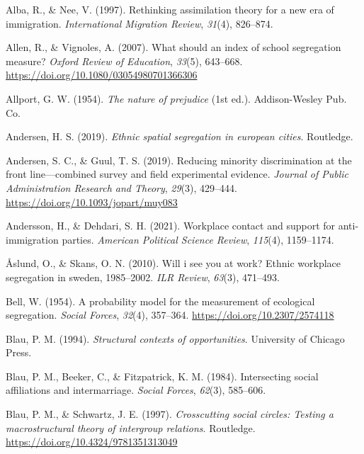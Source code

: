 \documentclass[
]{book}
\newlength{\cslhangindent}
\newenvironment{CSLReferences}[2] %
 {\begin{list}{}{%
  \setlength{\itemindent}{0pt}
  \setlength{\leftmargin}{0pt}
  \setlength{\parsep}{0pt}
  \ifodd #1
   \setlength{\leftmargin}{\cslhangindent}
   \setlength{\itemindent}{-1\cslhangindent}
  \fi
  \setlength{\itemsep}{#2\baselineskip}}}
 {\end{list}}
\begin{document}
\label{refs}
\begin{CSLReferences}{1}{0}
Alba, R., \& Nee, V. (1997). Rethinking assimilation theory for a new era of immigration. \emph{International Migration Review}, \emph{31}(4), 826--874.

Allen, R., \& Vignoles, A. (2007). What should an index of school segregation measure? \emph{Oxford Review of Education}, \emph{33}(5), 643--668. \url{https://doi.org/10.1080/03054980701366306}

Allport, G. W. (1954). \emph{The nature of prejudice} (1st ed.). Addison-Wesley Pub. Co.

Andersen, H. S. (2019). \emph{Ethnic spatial segregation in european cities}. Routledge.

Andersen, S. C., \& Guul, T. S. (2019). Reducing minority discrimination at the front line---combined survey and field experimental evidence. \emph{Journal of Public Administration Research and Theory}, \emph{29}(3), 429--444. \url{https://doi.org/10.1093/jopart/muy083}

Andersson, H., \& Dehdari, S. H. (2021). Workplace contact and support for anti-immigration parties. \emph{American Political Science Review}, \emph{115}(4), 1159--1174.

Åslund, O., \& Skans, O. N. (2010). Will i see you at work? Ethnic workplace segregation in sweden, 1985--2002. \emph{ILR Review}, \emph{63}(3), 471--493.

Bell, W. (1954). A probability model for the measurement of ecological segregation. \emph{Social Forces}, \emph{32}(4), 357--364. \url{https://doi.org/10.2307/2574118}

Blau, P. M. (1994). \emph{Structural contexts of opportunities}. University of Chicago Press.

Blau, P. M., Beeker, C., \& Fitzpatrick, K. M. (1984). Intersecting social affiliations and intermarriage. \emph{Social Forces}, \emph{62}(3), 585--606.

Blau, P. M., \& Schwartz, J. E. (1997). \emph{Crosscutting social circles: Testing a macrostructural theory of intergroup relations}. Routledge. \url{https://doi.org/10.4324/9781351313049}


\end{CSLReferences}
\end{document}

